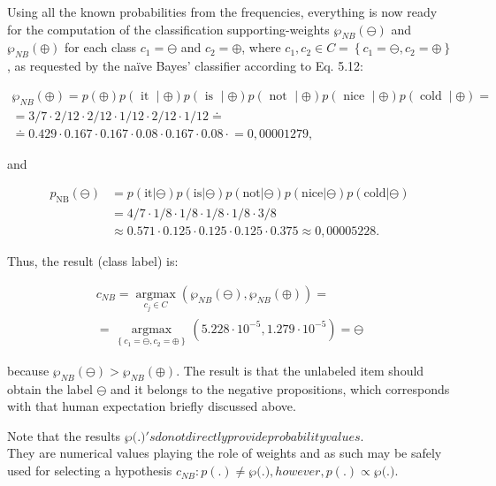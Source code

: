 \documentclass[11pt,openany,executivepaper]{book}
\begin{document}
Using all the known probabilities from the frequencies, everything is now ready for the computation of the classification supporting-weights $\wp_{N B}(\ominus)$ and $\wp_{N B}(\oplus)$ for each class $c_{1}=\ominus$ and $c_{2}=\oplus$, where $c_{1}, c_{2} \in C=\left\{c_{1}=\ominus, c_{2}=\oplus\right\}$, as requested by the naïve Bayes' classifier according to Eq. 5.12:

$$
\begin{gathered}
\wp_{N B}(\oplus)=p(\oplus) p(\text { it } \mid \oplus) p(\text { is } \mid \oplus) p(\text { not } \mid \oplus) p(\text { nice } \mid \oplus) p(\operatorname{cold} \mid \oplus)= \\
=3 / 7 \cdot 2 / 12 \cdot 2 / 12 \cdot 1 / 12 \cdot 2 / 12 \cdot 1 / 12 \doteq \\
\doteq 0.429 \cdot 0.167 \cdot 0.167 \cdot 0.08 \cdot 0.167 \cdot 0.08 \cdot \stackrel{ }{=} 0,00001279,
\end{gathered}
$$

and

\begin{align*}
    p_{\text{NB}}(\ominus) &= p(\text{it}|\ominus)p(\text{is}|\ominus)p(\text{not}|\ominus)p(\text{nice}|\ominus)p(\text{cold}|\ominus) \\
    &= 4/7 \cdot 1/8 \cdot 1/8 \cdot 1/8 \cdot 1/8 \cdot 3/8 \\
    &\approx 0.571 \cdot 0.125 \cdot 0.125 \cdot 0.125 \cdot 0.375 \approx 0,00005228.
\end{align*}

Thus, the result (class label) is:

$$
\begin{gathered}
c_{N B}=\underset{c_{j} \in C}{\operatorname{argmax}}\left(\wp_{N B}(\ominus), \wp_{N B}(\oplus)\right)= \\
=\underset{\left\{c_{1}=\ominus, c_{2}=\oplus\right\}}{\operatorname{argmax}}\left(5.228 \cdot 10^{-5}, 1.279 \cdot 10^{-5}\right)=\ominus
\end{gathered}
$$

because $\wp_{N B}(\ominus)>\wp_{N B}(\oplus)$. The result is that the unlabeled item should obtain the label $\ominus$ and it belongs to the negative propositions, which corresponds with that human expectation briefly discussed above.

Note that the results $\wp($.$) 's do not directly provide probability values.$\\
They are numerical values playing the role of weights and as such may be safely used for selecting a hypothesis $c_{N B}: p(.) \neq \wp($.$) , however, p(.) \propto \wp($.$) .$
\end{document}
